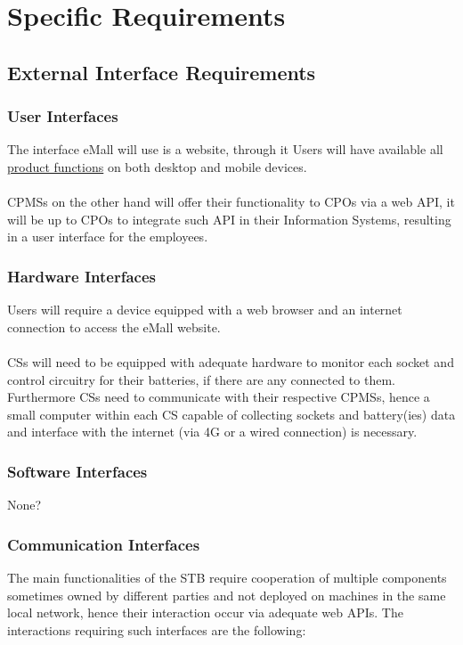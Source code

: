 \documentclass[11pt]{article}
\begin{document}
\section{Specific Requirements}

\subsection{External Interface Requirements}

\subsubsection{User Interfaces}

The interface eMall will use is a website, through it Users will have available all \hyperref[subsec:prodfunctions]{product functions} on both desktop and mobile devices. \\
\\
CPMSs on the other hand will offer their functionality to CPOs via a web API, it will be up to CPOs to integrate such API in their Information Systems, resulting in a user interface for the employees.

\subsubsection{Hardware Interfaces}

Users will require a device equipped with a web browser and an internet connection to access the eMall website. \\
\\
CSs will need to be equipped with adequate hardware to monitor each socket and control circuitry for their batteries, if there are any connected to them. Furthermore CSs need to communicate with their respective CPMSs, hence a small computer within each CS capable of collecting sockets and battery(ies) data and interface with the internet (via 4G or a wired connection) is necessary.

\subsubsection{Software Interfaces}

None?

\subsubsection{Communication Interfaces}

The main functionalities of the STB require cooperation of multiple components sometimes owned by different parties and not deployed on machines in the same local network, hence their interaction occur via adequate web APIs. The interactions requiring such interfaces are the following:
\end{document}
